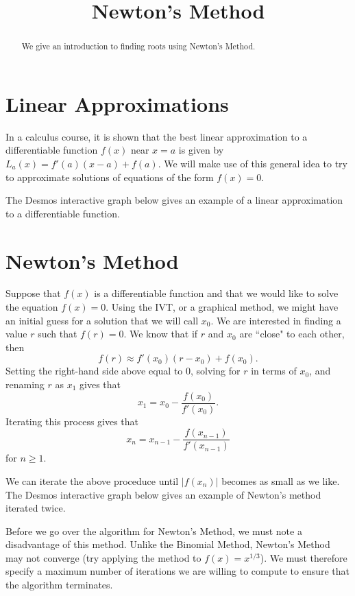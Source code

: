 \documentclass{ximera}
\title{Newton's Method}
\begin{document}
  
\begin{abstract}  
We give an introduction to finding roots using Newton's Method.
\end{abstract}  
\maketitle

\section{Linear Approximations}

In a calculus course, it is shown that the best linear approximation to a differentiable function $f(x)$ near $x=a$ is given by $L_a(x)=f'(a)(x-a)+f(a)$. We will make use of this general idea to try to approximate solutions of equations of the form $f(x)=0$. 

The Desmos interactive graph below gives an example of a linear approximation to a differentiable function.


\section{Newton's Method}

Suppose that $f(x)$ is a differentiable function and that we would like to solve the equation $f(x)=0$. Using the IVT, or a graphical method, we might have an initial guess for a solution that we will call $x_0$. We are interested in finding a value $r$ such that $f(r)=0$. We know that if $r$ and $x_0$ are ``close" to each other, then $$f(r)\approx f'(x_0)(r-x_0)+f(x_0).$$ Setting the right-hand side above equal to 0, solving for $r$ in terms of $x_0$, and renaming $r$ as $x_1$ gives that $$x_1=x_0-\frac{f(x_0)}{f'(x_0)}.$$ Iterating this process gives that $$x_n=x_{n-1}-\frac{f(x_{n-1})}{f'(x_{n-1})}$$ for $n\geq 1$.  

We can iterate the above proceduce until $|f(x_n)|$ becomes as small as we like. The Desmos interactive graph below gives an example of Newton's method iterated twice.


Before we go over the algorithm for Newton's Method, we must note a disadvantage of this method. Unlike the Binomial Method, Newton's Method may not converge (try applying the method to $f(x)=x^{1/3}$). We must therefore specify a maximum number of iterations we are willing to compute to ensure that the algorithm terminates.
\end{document}
